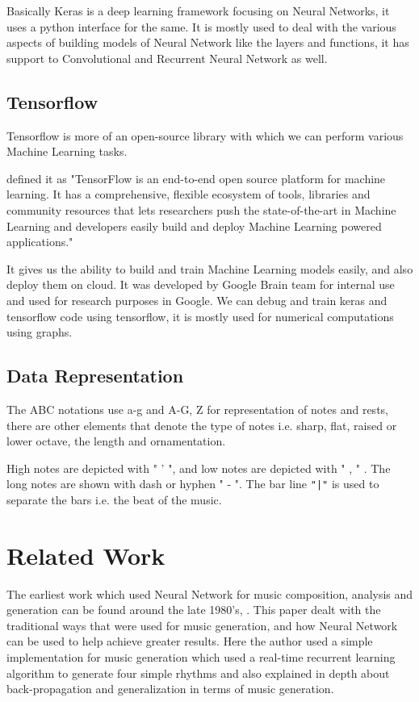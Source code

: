 \documentclass[oneside,12pt]{Classes/RoboticsLaTeX}
\begin{document}
Basically Keras is a deep learning framework focusing on Neural Networks, it uses a python interface for the same. It is mostly used to deal with the various aspects of building models of Neural Network like the layers and functions, it has support to Convolutional and Recurrent Neural Network as well.

\section{Tensorflow}

Tensorflow is more of an open-source library with which we can perform various Machine Learning tasks.

\cite{tensorflow} defined it as "TensorFlow is an end-to-end open source platform for machine learning. It has a comprehensive, flexible ecosystem of tools, libraries and community resources that lets researchers push the state-of-the-art in Machine Learning and developers easily build and deploy Machine Learning powered applications."

It gives us the ability to build and train Machine Learning models easily, and also deploy them on cloud. It was developed by Google Brain team for internal use and used for research purposes in Google. We can debug and train keras and tensorflow code using tensorflow, it is mostly used for numerical computations using graphs.

\section{Data Representation}

The ABC notations use a-g and A-G, Z for representation of notes and rests, there are other elements that denote the type of notes i.e. sharp, flat, raised or lower octave, the length and ornamentation.

High notes are depicted with " ' ", and low notes are depicted with " , " . The long notes are shown with dash or hyphen " - ". The bar line \verb+"|"+ is used to separate the bars i.e. the beat of the music.



\chapter{Related Work}
\label{chap:rel_work}

The earliest work which used Neural Network for music composition, analysis and generation can be found around the late 1980's, \cite{mdolson}. This paper dealt with the traditional ways that were used for music generation, and how Neural Network can be used to help achieve greater results. Here the author used a simple implementation for music generation which used a real-time recurrent learning algorithm to generate four simple rhythms and also explained in depth about back-propagation and generalization in terms of music generation. 
\end{document}
